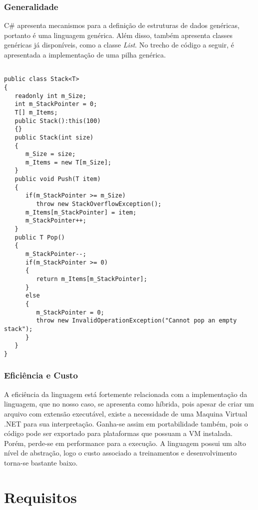 \documentclass[rel_mlp]{iiufrgs}
\begin{document}
\subsection{Generalidade}

C\# apresenta mecanismos para a definição de estruturas de dados genéricas, portanto é uma linguagem genérica. Além disso, também apresenta classes genéricas já disponíveis, como a classe \textit{List}. No trecho de código a seguir, é apresentada a implementação de uma pilha genérica.

\begin{lstlisting}[caption=Trecho de código C\# retirado de documentação \textit{online} da linguagem, label=lst:test]

public class Stack<T>
{
   readonly int m_Size; 
   int m_StackPointer = 0;
   T[] m_Items;
   public Stack():this(100)
   {}
   public Stack(int size)
   {
      m_Size = size;
      m_Items = new T[m_Size];
   }
   public void Push(T item)
   {
      if(m_StackPointer >= m_Size) 
         throw new StackOverflowException();
      m_Items[m_StackPointer] = item;
      m_StackPointer++;
   }
   public T Pop()
   {
      m_StackPointer--;
      if(m_StackPointer >= 0)
      {
         return m_Items[m_StackPointer];
      }
      else
      {
         m_StackPointer = 0;
         throw new InvalidOperationException("Cannot pop an empty stack");
      }
   }
}

\end{lstlisting}

\subsection{Eficiência e Custo}

A eficiência da linguagem está fortemente relacionada com a implementação da linguagem, que no nosso caso, se apresenta como híbrida, pois apesar de criar um arquivo com extensão executável, existe a necessidade de uma Maquina Virtual .NET para sua interpretação. Ganha-se assim em portabilidade também, pois o código pode ser exportado para plataformas que possuam a VM instalada. Porém, perde-se em performance para a execução. A linguagem possui um alto nível de abstração, logo o custo associado a treinamentos e desenvolvimento torna-se bastante baixo.

%
\chapter{Requisitos}
\end{document}
